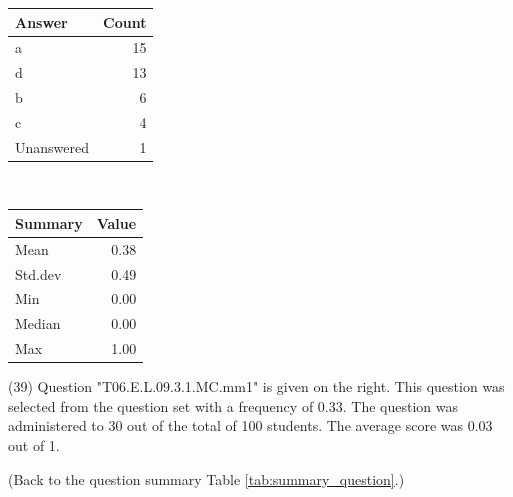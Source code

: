 \documentclass[12pt,nohyper]{tufte-handout}\usepackage[]{graphicx}\usepackage[]{color}
\begin{document}
\begin{center}%
\begin{tabular}{lr}
  \hline
Answer & Count \\ 
  \hline
a &  15 \\ 
  d &  13 \\ 
  b &   6 \\ 
  c &   4 \\ 
  Unanswered &   1 \\ 
   \hline
\end{tabular}
~~~~~~~~%
\begin{tabular}{lr}
  \hline
Summary & Value \\ 
  \hline
Mean & 0.38 \\ 
  Std.dev & 0.49 \\ 
  Min & 0.00 \\ 
  Median & 0.00 \\ 
  Max & 1.00 \\ 
   \hline
\end{tabular}
\end{center}\newpage{} (39) Question "T06.E.L.09.3.1.MC.mm1" is given on the right. This question was selected from the question set with a frequency of 0.33. The question was administered to 30 out of the total of 100 students. The average score was 0.03 out of 1.

 (Back to the question summary Table \ref{tab:summary_question}.)
\end{document}
